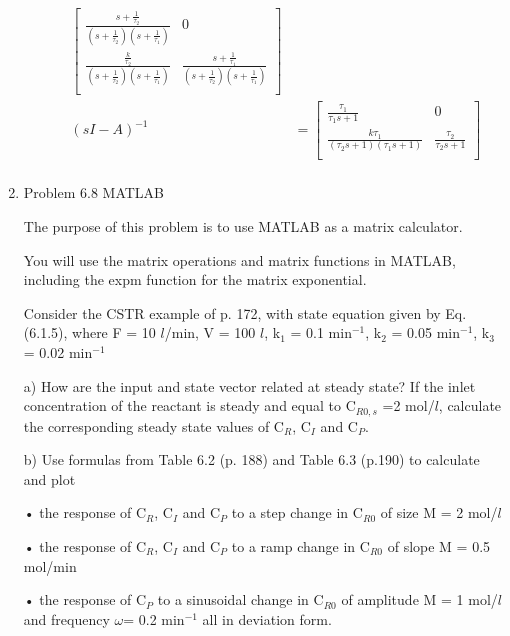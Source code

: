 \documentclass[12pt]{article}
\begin{document}
\begin{enumerate}
\begin{enumerate}
\begin{align*}
\begin{bmatrix}
            \frac{s + \frac{1}{\tau_2}}{\left(s + \frac{1}{\tau_2}\right) \left(s + \frac{1}{\tau_1}\right)} & 0 \\
            \frac{\frac{k}{\tau_2}}{\left(s + \frac{1}{\tau_2}\right) \left(s + \frac{1}{\tau_1}\right)} & \frac{s + \frac{1}{\tau_1}}{\left(s + \frac{1}{\tau_2}\right) \left(s + \frac{1}{\tau_1}\right)} \\
        \end{bmatrix} \\
        (sI - A)^{-1} &= 
        \begin{bmatrix}
            \frac{\tau_1}{\tau_1 s + 1} & 0 \\
            \frac{k \tau_1}{\left(\tau_2 s + 1\right) \left(\tau_1 s + 1\right)} & \frac{\tau_2}{\tau_2 s + 1} \\
        \end{bmatrix} \\
    \end{align*}
\end{enumerate}


\newpage
\item Problem 6.8 MATLAB

The purpose of this problem is to use MATLAB as a matrix calculator.

You will use the matrix operations and matrix functions in MATLAB, including the expm function for the matrix exponential.

Consider the CSTR example of p. 172, with state equation given by Eq. (6.1.5), where F = 10 $l$/min, V = 100 $l$, k$_1$ = 0.1 min$^{-1}$, k$_2$ = 0.05 min$^{-1}$, k$_3$ = 0.02 min$^{-1}$

a) How are the input and state vector related at steady state? If the inlet concentration of the reactant is steady and equal to C$_{R0,s}$ =2 mol/$l$, calculate the corresponding steady state values of C$_R$, C$_I$ and C$_P$.

b) Use formulas from Table 6.2 (p. 188) and Table 6.3 (p.190) to calculate and plot

• the response of C$_R$, C$_I$ and C$_P$ to a step change in C$_{R0}$ of size M = 2 mol/$l$

• the response of C$_R$, C$_I$ and C$_P$ to a ramp change in C$_{R0}$ of slope M = 0.5 mol/min

• the response of C$_P$ to a sinusoidal change in C$_{R0}$ of amplitude M = 1 mol/$l$ and frequency $\omega$= 0.2 min$^{-1}$ all in deviation form.


\end{enumerate}
\end{document}
